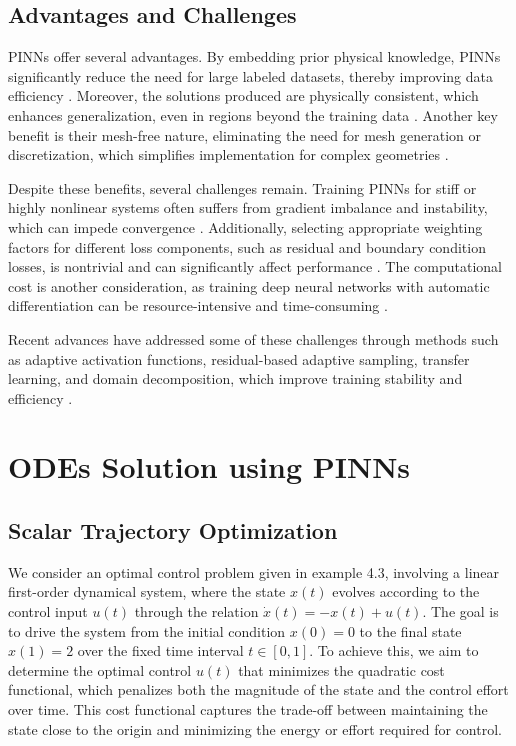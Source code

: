 \subsection{Advantages and Challenges}

PINNs offer several advantages. By embedding prior physical knowledge, PINNs significantly reduce the need for large labeled datasets, thereby improving data efficiency \cite{raissi2019physics,karniadakis2021physics}. Moreover, the solutions produced are physically consistent, which enhances generalization, even in regions beyond the training data \cite{cuomo2022scientific}. Another key benefit is their mesh-free nature, eliminating the need for mesh generation or discretization, which simplifies implementation for complex geometries \cite{raissi2019physics}.

Despite these benefits, several challenges remain. Training PINNs for stiff or highly nonlinear systems often suffers from gradient imbalance and instability, which can impede convergence \cite{wang2021understanding,lu2021deepxde}. Additionally, selecting appropriate weighting factors for different loss components, such as residual and boundary condition losses, is nontrivial and can significantly affect performance \cite{mcclenny2020self}. The computational cost is another consideration, as training deep neural networks with automatic differentiation can be resource-intensive and time-consuming \cite{shukla2021parallel}.

Recent advances have addressed some of these challenges through methods such as adaptive activation functions, residual-based adaptive sampling, transfer learning, and domain decomposition, which improve training stability and efficiency \cite{mcclenny2020self,shukla2021parallel,lu2021deepxde}.


\section{ODEs Solution using PINNs}
\subsection{Scalar Trajectory Optimization}

We consider an optimal control problem given in \cite{pinch1995optimal} example 4.3, involving a linear first-order dynamical system, where the state \( x(t) \) evolves according to the control input \( u(t) \) through the relation \( \dot{x}(t) = -x(t) + u(t) \). The goal is to drive the system from the initial condition \( x(0) = 0 \) to the final state \( x(1) = 2 \) over the fixed time interval \( t \in [0, 1] \). To achieve this, we aim to determine the optimal control \( u(t) \) that minimizes the quadratic cost functional, which penalizes both the magnitude of the state and the control effort over time. This cost functional captures the trade-off between maintaining the state close to the origin and minimizing the energy or effort required for control.

